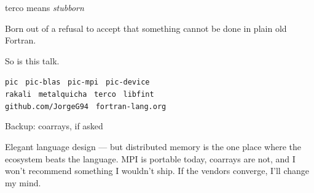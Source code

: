\documentclass[aspectratio=169]{beamer}
\begin{document}
\begin{frame}{terco means \emph{stubborn}}
  \begin{cookiequote}
    Born out of a refusal to accept that something cannot be done in plain old Fortran.
  \end{cookiequote}
  \vspace{.8em}
  \centering
  {\large So is this talk.}

  \vspace{1.2em}
  {\footnotesize
  \texttt{pic} \textperiodcentered\ \texttt{pic-blas} \textperiodcentered\ \texttt{pic-mpi} \textperiodcentered\ \texttt{pic-device} \\
  \texttt{rakali} \textperiodcentered\ \texttt{metalquicha} \textperiodcentered\ \texttt{terco} \textperiodcentered\ \texttt{libfint} \\[.4em]
  \texttt{github.com/JorgeG94} \textperiodcentered\ \texttt{fortran-lang.org}}
\end{frame}

\appendix

\begin{frame}{Backup: coarrays, if asked}
  \begin{cookiequote}
    Elegant language design --- but distributed memory is the one place where the
    ecosystem beats the language. MPI is portable today, coarrays are not, and I won't
    recommend something I wouldn't ship. If the vendors converge, I'll change my mind.
  \end{cookiequote}
\end{frame}
\end{document}
